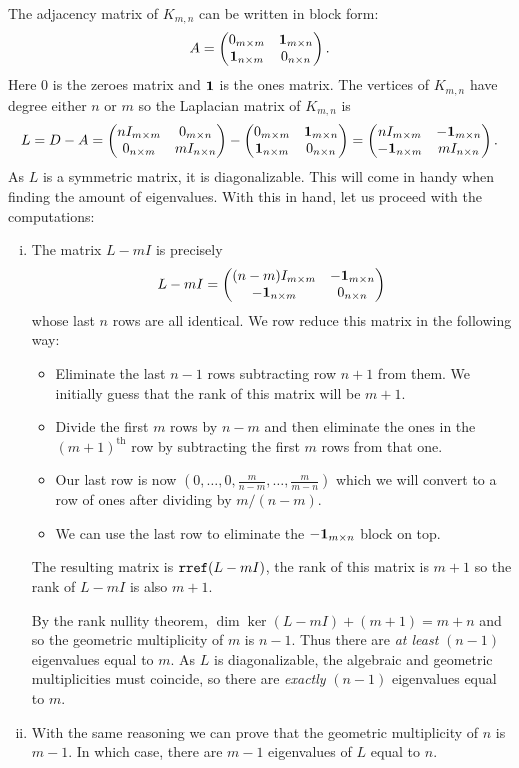 \documentclass[12pt]{memoir}
\begin{document}
\begin{ptcbr}
    The adjacency matrix of $K_{m,n}$ can be written in block form:
    $$A=\begin{pmatrix} 0_{m\times m} & \mathbf{1}_{m\times n} \\ \mathbf{1}_{n\times m} & 0_{n\times n} \end{pmatrix}.$$
    Here $0$ is the zeroes matrix and $\mathbf{1}$ is the ones matrix. The vertices of $K_{m,n}$ have degree either $n$ or $m$ so the Laplacian matrix of $K_{m,n}$ is
    $$L=D-A=\begin{pmatrix} nI_{m\times m} & 0_{m\times n} \\ 0_{n\times m} & mI_{n\times n} \end{pmatrix}-\begin{pmatrix} 0_{m\times m} & \mathbf{1}_{m\times n} \\ \mathbf{1}_{n\times m} & 0_{n\times n} \end{pmatrix}=\begin{pmatrix} nI_{m\times m} & -\mathbf{1}_{m\times n} \\ -\mathbf{1}_{n\times m} & mI_{n\times n} \end{pmatrix}.$$
    As $L$ is a symmetric matrix, it is diagonalizable. This will come in handy when finding the amount of eigenvalues. With this in hand, let us proceed with the computations:
    \begin{enumerate}[i)]
        \itemsep=-0.4em
        \item The matrix $L-mI$ is precisely 
        $$L-mI=\begin{pmatrix} (n-m)I_{m\times m} & -\mathbf{1}_{m\times n} \\ -\mathbf{1}_{n\times m} & 0_{n\times n} \end{pmatrix}$$
        whose last $n$ rows are all identical. We row reduce this matrix in the following way: 
        \begin{itemize}
            \itemsep=-0.3em
            \item Eliminate the last $n-1$ rows subtracting row $n+1$ from them. We initially guess that the rank of this matrix will be $m+1$.
            \item Divide the first $m$ rows by $n-m$ and then eliminate the ones in the $(m+1)^{\text{th}}$ row by subtracting the first $m$ rows from that one. 
            \item Our last row is now $(0,\dots,0,\frac{m}{n-m},\dots,\frac{m}{m-n})$ which we will convert to a row of ones after dividing by $m/(n-m)$. 
            \item We can use the last row to eliminate the $-\mathbf{1}_{m\times n}$ block on top. 
        \end{itemize}
        The resulting matrix is $\texttt{rref}(L-mI)$, the rank of this matrix is $m+1$ so the rank of $L-mI$ is also $m+1$.\par 
        By the rank nullity theorem, $\dim\ker(L-mI)+(m+1)=m+n$ and so the geometric multiplicity of $m$ is $n-1$. Thus there are \emph{at least} $(n-1)$ eigenvalues equal to $m$. As $L$ is diagonalizable, the algebraic and geometric multiplicities must coincide, so there are \emph{exactly} $(n-1)$ eigenvalues equal to $m$. 
        \item With the same reasoning we can prove that the geometric multiplicity of $n$ is $m-1$. In which case, there are $m-1$ eigenvalues of $L$ equal to $n$.

\end{enumerate}
\end{ptcbr}
\end{document}
